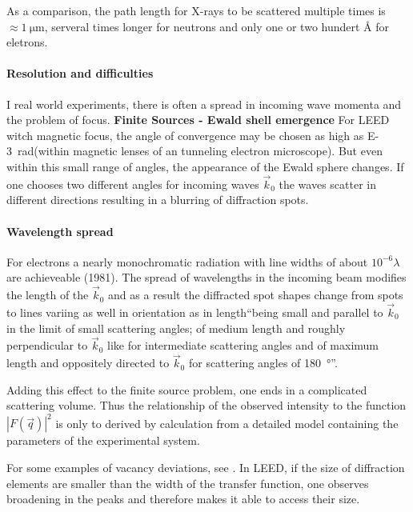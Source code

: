As a comparison, the path length for X-rays to be scattered multiple times is $\approx \SI{1}{\micro \meter}$, serveral times longer for neutrons and only one or two hundert \si{\angstrom} for eletrons\cite[90]{cowley_diffraction_1981}.

\paragraph{Resolution and difficulties}
I real world experiments, there is often a spread in incoming wave momenta and the problem of focus. 
\textbf{Finite Sources - Ewald shell emergence}
For LEED witch magnetic focus, the angle of convergence may be chosen as high as \SI{E-3}{\radian}(within magnetic lenses of an tunneling electron microscope). But even within this small range of angles, the appearance of the Ewald sphere changes. If one chooses two different angles for incoming waves $\vec k_0$ the waves scatter in different directions resulting in a blurring of diffraction spots.

\paragraph{Wavelength spread}
For electrons a nearly monochromatic radiation with line widths of about $10^{-6}\lambda$ are achieveable (1981). The spread of wavelengths in the incoming beam modifies the length of the $\vec k_0$ and as a result the diffracted spot shapes change from spots to lines variing as well in orientation as in length\cite[113]{cowley_diffraction_1981}``being small and parallel to $\vec k_0$ in the limit of small scattering angles; of medium length and roughly perpendicular to $\vec k_0$ like for intermediate scattering angles and of maximum length and oppositely directed to $\vec k_0$ for scattering angles of \SI{180}{\degree}''.

Adding this effect to the finite source problem, one ends in a complicated scattering volume. Thus the relationship of the observed intensity to the function $|F(\vec q)|^2$ is only to derived by calculation from a detailed model containing the parameters of the experimental system.

For some examples of vacancy deviations, see \cite[144-151]{cowley_diffraction_1981}.
In LEED, if the size of diffraction elements are smaller than the width of the transfer function, one observes broadening in the peaks and therefore makes it able to access their size\cite[40]{liuksiutov_two-dimensional_1992}.

